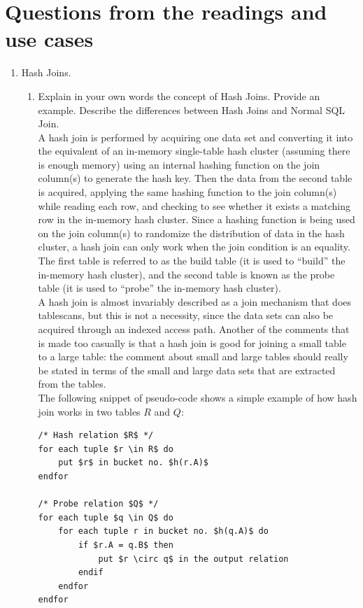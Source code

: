 \documentclass{article}
\begin{document}
\section{Questions from the readings and use cases}
    \begin{enumerate}[label=(\alph*)]
        \item Hash Joins.
        \begin{enumerate}[label=\arabic*.]
            \item Explain in your own words the concept of Hash Joins. Provide an example. Describe the differences between Hash Joins and Normal SQL Join.\\
\newline
A hash join is performed by acquiring one data set and converting it into the equivalent of an in-memory single-table hash cluster (assuming there is enough memory) using an internal hashing function on the join column(s) to generate the hash key. Then the data from the second table is acquired, applying the same hashing function to the join column(s) while reading each row, and checking to see whether it exists a matching row in the in-memory hash cluster. Since a hashing function is being used on the join column(s) to randomize the distribution of data in the hash cluster, a hash join can only work when the join condition is an equality. The first table is referred to as the build table (it is used to “build” the in-memory hash cluster), and the second table is known as the probe table (it is used to “probe” the in-memory hash cluster).\\
A hash join is almost invariably described as a join mechanism that does tablescans, but this is not a necessity, since the data sets can also be acquired through an indexed access path. Another of the comments that is made too casually is that a hash join is good for joining a small table to a large table: the comment about small and large tables should really be stated in terms of the small and large data sets that are extracted from the tables.\\
The following snippet of pseudo-code shows a simple example of how hash join works in two tables $R$ and $Q$:
        \begin{lstlisting}
/* Hash relation $R$ */
for each tuple $r \in R$ do
    put $r$ in bucket no. $h(r.A)$
endfor

/* Probe relation $Q$ */
for each tuple $q \in Q$ do
    for each tuple r in bucket no. $h(q.A)$ do
        if $r.A = q.B$ then
            put $r \circ q$ in the output relation
        endif
    endfor
endfor \end{lstlisting}


\end{enumerate}
\end{enumerate}
\end{document}
